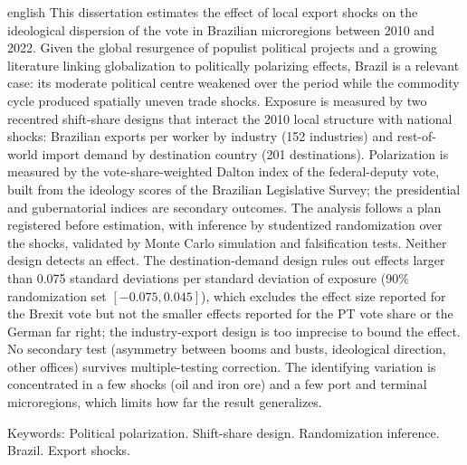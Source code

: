 \documentclass[
	11pt,				%
	oneside,			%
	a4paper,			%
	english,			%
	english				%
	]{abntex2ppgsi}
\theoremstyle{plain}
\theoremstyle{remark}
\theoremstyle{plain}%
\theoremstyle{remark}%
\begin{document}
\begin{resumo}[Abstract]
\begin{otherlanguage*}{english}
This dissertation estimates the effect of local export shocks on the ideological dispersion of the vote in Brazilian microregions between 2010 and 2022. Given the global resurgence of populist political projects and a growing literature linking globalization to politically polarizing effects, Brazil is a relevant case: its moderate political centre weakened over the period while the commodity cycle produced spatially uneven trade shocks.
Exposure is measured by two recentred shift-share designs that interact the 2010 local structure with national shocks: Brazilian exports per worker by industry (152 industries) and rest-of-world import demand by destination country (201 destinations). Polarization is measured by the vote-share-weighted Dalton index of the federal-deputy vote, built from the ideology scores of the Brazilian Legislative Survey; the presidential and gubernatorial indices are secondary outcomes. The analysis follows a plan registered before estimation, with inference by studentized randomization over the shocks, validated by Monte Carlo simulation and falsification tests.
Neither design detects an effect. The destination-demand design rules out effects larger than 0.075 standard deviations per standard deviation of exposure (90\% randomization set $[-0.075, 0.045]$), which excludes the effect size reported for the Brexit vote but not the smaller effects reported for the PT vote share or the German far right; the industry-export design is too imprecise to bound the effect. No secondary test (asymmetry between booms and busts, ideological direction, other offices) survives multiple-testing correction. The identifying variation is concentrated in a few shocks (oil and iron ore) and a few port and terminal microregions, which limits how far the result generalizes.


Keywords: Political polarization. Shift-share design. Randomization inference. Brazil. Export shocks.
\end{otherlanguage*}
\end{resumo}





\listoffigures*
\cleardoublepage

\listoftables*
\cleardoublepage



\tableofcontents*
\cleardoublepage
\end{document}
